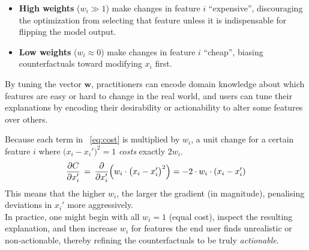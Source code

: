 \documentclass[12pt]{extarticle}
\numberwithin{equation}{section}
\begin{document}
\begin{itemize}
  \item \textbf{High weights} (\(w_i \!\!\gg\! 1\)) make changes in feature \(i\) “expensive”, discouraging the optimization from selecting that feature unless it is indispensable for flipping the model output.
  \item \textbf{Low weights} (\(w_i \!\!\approx\! 0\)) make changes in feature \(i\) “cheap”, biasing counterfactuals toward modifying \(x_i\) first.
\end{itemize}
By tuning the vector \(\mathbf{w}\), practitioners can encode domain knowledge about which features are easy or hard to change in the real world, and users can tune their explanations by encoding their desirability or actionability to alter some features over others.

Because each term in ~\eqref{eq:cost} is multiplied by \(w_i\), a unit change for a certain feature $i$ where 
\(\bigl(x_i-x_i'\bigr)^2=1\) \emph{costs} exactly \(2w_i\).
\[
\frac{\partial C}{\partial x_i'}
\,=\,
\frac{\partial}{\partial x_i'}
\Bigl(w_i \cdot \bigl(x_i-x_i'\bigr)^2\Bigr)
= - 2 \cdot w_i \cdot (x_i - x_i')
\]
This means that the higher \(w_i\), the larger the gradient (in magnitude), penalising deviations in \(x_i'\) more aggressively. \\

In practice, one might begin with all \(w_i = 1\) (equal cost), inspect the resulting explanation, and then increase \(w_i\) for features the end user finds unrealistic or non‐actionable, thereby refining the counterfactuals to be truly \emph{actionable}.
\end{document}
